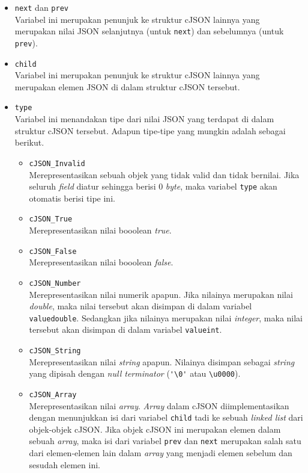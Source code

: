 \begin{itemize}
	\item \verb|next| dan \verb|prev|\\
	Variabel ini merupakan penunjuk ke struktur cJSON lainnya yang merupakan nilai JSON selanjutnya (untuk \verb|next|) dan sebelumnya (untuk \verb|prev|).
	\item \verb|child|\\
	Variabel ini merupakan penunjuk ke struktur cJSON lainnya yang merupakan elemen JSON di dalam struktur cJSON tersebut.
	\item \verb|type|\\
	Variabel ini menandakan tipe dari nilai JSON yang terdapat di dalam struktur cJSON tersebut. Adapun tipe-tipe yang mungkin adalah sebagai berikut.
	
	\begin{itemize}
		\item \verb|cJSON_Invalid|\\
		Merepresentasikan sebuah objek yang tidak valid dan tidak bernilai. Jika seluruh \textit{field} diatur sehingga berisi 0 \textit{byte}, maka variabel \verb|type| akan otomatis berisi tipe ini.
		\item \verb|cJSON_True|\\
		Merepresentasikan nilai booolean \textit{true}.
		\item \verb|cJSON_False|\\
		Merepresentasikan nilai booolean \textit{false}.
		\item \verb|cJSON_Number|\\
		Merepresentasikan nilai numerik apapun. Jika nilainya merupakan nilai \textit{double}, maka nilai tersebut akan disimpan di dalam variabel \verb|valuedouble|. Sedangkan jika nilainya merupakan nilai \textit{integer}, maka nilai tersebut akan disimpan di dalam variabel \verb|valueint|.
		\item \verb|cJSON_String|\\
		Merepresentasikan nilai \textit{string} apapun. Nilainya disimpan sebagai \textit{string} yang dipisah dengan \textit{null terminator} (\verb|'\0'| atau \verb|\u0000|).
		\item \verb|cJSON_Array|\\
		Merepresentasikan nilai \textit{array}. \textit{Array} dalam cJSON diimplementasikan dengan menunjukkan isi dari variabel \verb|child| tadi ke sebuah \textit{linked list} dari objek-objek cJSON. Jika objek cJSON ini merupakan elemen dalam sebuah \textit{array}, maka isi dari variabel \verb|prev| dan \verb|next| merupakan salah satu dari elemen-elemen lain dalam \textit{array} yang menjadi elemen sebelum dan sesudah elemen ini.

\end{itemize}
\end{itemize}
